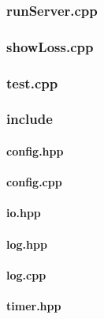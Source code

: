 \documentclass[12pt]{article}
\newcommand{\incFile}[2]{\label{code:#2}\newpage}
\begin{document}
\subsubsection{runServer.cpp}										\incFile{C++}{AlphaZeroPytorch/runServer.cpp}
\subsubsection{showLoss.cpp}										\incFile{C++}{AlphaZeroPytorch/showLoss.cpp}
\subsubsection{test.cpp}												\incFile{C++}{AlphaZeroPytorch/test.cpp}
\subsubsection{include}													%
\paragraph{config.hpp}													\incFile{C++}{AlphaZeroPytorch/include/config.hpp} \label{code:config}
\paragraph{config.cpp}													\incFile{C++}{AlphaZeroPytorch/include/config.cpp}
\paragraph{io.hpp}															\incFile{C++}{AlphaZeroPytorch/include/io.hpp}
\paragraph{log.hpp}														\incFile{C++}{AlphaZeroPytorch/include/log.hpp}
\paragraph{log.cpp}														\incFile{C++}{AlphaZeroPytorch/include/log.cpp}
\paragraph{timer.hpp}													\incFile{C++}{AlphaZeroPytorch/include/timer.hpp}
\end{document}
